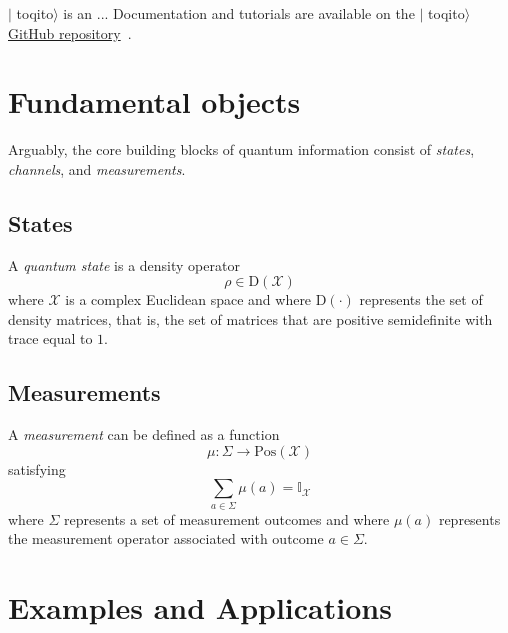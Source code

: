 \documentclass[nofootinbib,superscriptaddress,a4paper,twocolumn,longbibliography,floatfix,pra]{revtex4-2}
\newcommand{\I}{\mathbb{I}}
\newcommand{\setft}[1]{\mathrm{#1}}
\newcommand{\Density}{\setft{D}}
\newcommand{\Pos}{\setft{Pos}}
\newcommand{\toqitofont}{%
	\fontfamily{FiraSans}%
	\selectfont}
\newcommand{\toqito}{ $|${\toqitofont toqito}$\rangle$\xspace}
\newcommand{\X}{\mathcal{X}}
\begin{document}
\toqito is an ... Documentation and tutorials are available on the \toqito
\href{https://github.com/vprusso/toqito}{GitHub repository}~\cite{toqito}.


\section{Fundamental objects}
\label{sec:fundemental_objects}

Arguably, the core building blocks of quantum information consist of
\emph{states}, \emph{channels}, and \emph{measurements}.\\

\subsection{States}\label{sec:states}

A \emph{quantum state} is a density operator
\begin{equation}
    \rho \in \Density(\X)
\end{equation}
where $\X$ is a complex Euclidean space and where $\Density(\cdot)$ represents
the set of density matrices, that is, the set of matrices that are positive
semidefinite with trace equal to $1$.

\subsection{Measurements}
\label{sec:measurements}

A \emph{measurement} can be defined as a function
\begin{equation}
    \mu: \Sigma \rightarrow \Pos(\X)
\end{equation}
satisfying
\begin{equation}
    \sum_{a \in \Sigma} \mu(a) = \I_{\X}
\end{equation}
where $\Sigma$ represents a set of measurement outcomes and where $\mu(a)$
represents the measurement operator associated with outcome $a \in \Sigma$.

\section{Examples and Applications}
\label{sec:examples_and_applications}
\end{document}
